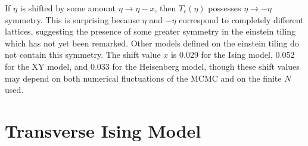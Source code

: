 \documentclass[
  amsmath,
  amssymb,
  aps,
  twocolumn,
  nofootinbib,
  nolongbibliography,
  floatfix,
]{revtex4-2}
\begin{document}
If $\eta$ is shifted by some amount $\eta \rightarrow \eta - x$, then $T_c(\eta)$ possesses $\eta\rightarrow -\eta$ symmetry. This is surprising because $\eta$ and $-\eta$ correspond to completely different lattices, suggesting the presence of some greater symmetry in the einstein tiling which has not yet been remarked. Other models defined on the einstein tiling do not contain this symmetry. The shift value $x$ is 0.029 for the Ising model, 0.052 for the XY model, and 0.033 for the Heisenberg model, though these shift values may depend on both numerical fluctuations of the MCMC and on the finite $N$ used.

\section{Transverse Ising Model}
\label{sec:tim}
\end{document}
